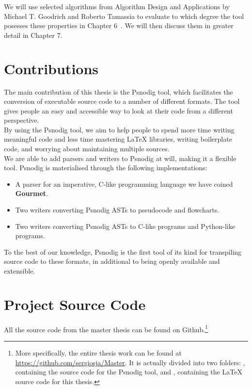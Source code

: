We will use selected algorithms from Algorithm Design and Applications by Michael T. Goodrich and Roberto Tamassia to evaluate to which degree the tool posesses these properties in Chapter 6~\cite{pseudocodeInBook2}. We will then discuss them in greater detail in Chapter 7.

\section{Contributions}

The main contribution of this thesis is the Psnodig tool, which facilitates the conversion of executable source code to a number of different formats. The tool gives people an easy and accessible way to look at their code from a different perspective. \\

By using the Psnodig tool, we aim to help people to spend more time writing meaningful code and less time mastering LaTeX libraries, writing boilerplate code, and worrying about maintaining multiple sources. \\

We are able to add parsers and writers to Psnodig at will, making it a flexible tool. Psnodig is materialised through the following implementations:

\begin{itemize}
    \item A parser for an imperative, C-like programming language we have coined \textbf{Gourmet}.
    \item Two writers converting Psnodig ASTs to pseudocode and flowcharts.
    \item Two writers converting Psnodig ASTs to C-like programs and Python-like programs.
\end{itemize}

To the best of our knowledge, Psnodig is the first tool of its kind for transpiling source code to these formats, in additional to being openly available and extensible.

\section{Project Source Code}

All the source code from the master thesis can be found on Github.\footnote{More specifically, the entire thesis work can be found at \url{https://github.com/sergiosja/Master}. It is actually divided into two folders: , containing the source code for the Psnodig tool, and , containing the LaTeX source code for this thesis.}